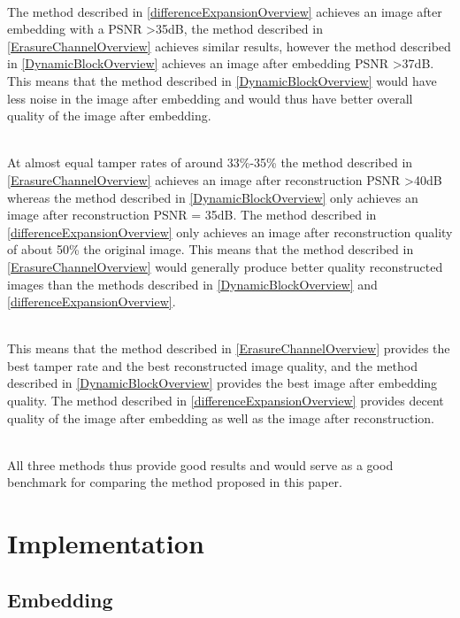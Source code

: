 \documentclass[12pt]{article}
\begin{document}
\hspace{0pt} \\
The method described in \ref{differenceExpansionOverview} achieves an image after embedding with a PSNR \textgreater 35dB, the method described in \ref{ErasureChannelOverview} achieves similar results, however the method described in \ref{DynamicBlockOverview} achieves an image after embedding PSNR \textgreater 37dB.
This means that the method described in \ref{DynamicBlockOverview} would have less noise in the image after embedding and would thus have better overall quality of the image after embedding.

\hspace{0pt} \\
At almost equal tamper rates of around 33\%-35\% the method described in \ref{ErasureChannelOverview} achieves an image after reconstruction PSNR \textgreater 40dB whereas the method described in \ref{DynamicBlockOverview} only achieves an image after reconstruction PSNR = 35dB.
The method described in \ref{differenceExpansionOverview} only achieves an image after reconstruction quality of about 50\% the original image.
This means that the method described in \ref{ErasureChannelOverview} would generally produce better quality reconstructed images than the methods described in \ref{DynamicBlockOverview} and \ref{differenceExpansionOverview}.

\hspace{0pt} \\
This means that the method described in \ref{ErasureChannelOverview} provides the best tamper rate and the best reconstructed image quality, and the method described in \ref{DynamicBlockOverview} provides the best image after embedding quality.
The method described in \ref{differenceExpansionOverview} provides decent quality of the image after embedding as well as the image after reconstruction.

\hspace{0pt} \\
All three methods thus provide good results and would serve as a good benchmark for comparing the method proposed in this paper.

\section{Implementation}
\label{Implementation}

\subsection{Embedding}
\label{embedding}
\end{document}
